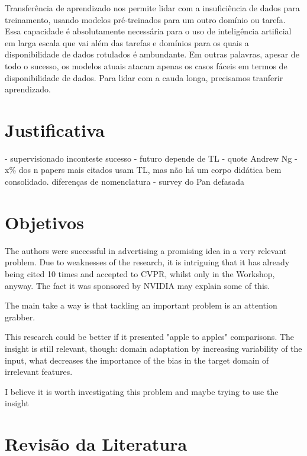 \documentclass[
12pt, %
a4paper, %
onecolumn, %
]{article}
\begin{document}
Transferência de aprendizado nos permite lidar com a insuficiência de dados para treinamento, usando modelos pré-treinados para um outro domínio ou tarefa. Essa capacidade é absolutamente necessária para o uso de inteligência artificial em larga escala que vai além das tarefas e domínios para os quais a disponibilidade de dados rotulados é ambundante. Em outras palavras, apesar de todo o sucesso, os modelos atuais atacam apenas os casos fáceis em termos de disponibilidade de dados. Para lidar com a cauda longa, precisamos tranferir aprendizado.


\section{Justificativa}

- supervisionado inconteste sucesso
- futuro depende de TL
- quote Andrew Ng
- x\% dos n papers mais citados usam TL, mas não há um corpo didática bem consolidado. diferenças de nomenclatura
- survey do Pan defasada



\section{Objetivos}

The authors were successful in advertising a promising idea in a very relevant problem.  Due to weaknesses of the research, it is intriguing that it has already being cited 10 times and accepted to CVPR, whilst only in the Workshop, anyway. The fact it was sponsored by NVIDIA may explain some of this.

The main take a way is that tackling an important problem is an attention grabber. 

This research could be better if it presented "apple to apples" comparisons. The insight is still relevant, though: domain adaptation by increasing variability of the input, what decreases the importance of the bias in the target domain of irrelevant features.

I believe it is worth investigating this problem and maybe trying to use the insight


\section{Revisão da Literatura}
\end{document}
